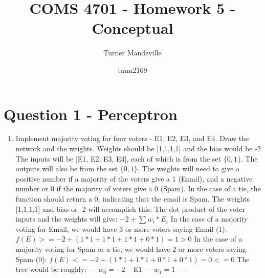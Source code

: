 \documentclass{article}
\title{COMS 4701 - Homework 5 - Conceptual}
\author
{
Turner Mandeville
\and tmm2169
}
\date{}
\begin{document}
    \maketitle
    \section*{Question 1 - Perceptron}
    \begin{enumerate}
        \item Implement majority voting for four voters - E1, E2, E3, and E4. Draw the network and the weights. 
        \newline
        Weights should be [1,1,1,1] and the bias would be -2
        \newline
        The inputs will be [E1, E2, E3, E4], each of which is from the set $\{0, 1\}$. The outputs will also be from the set $\{0, 1\}$.
        \newline
        The weights will need to give a positive number if a majority of the voters give a 1 (Email), and a negative number or 0 if the majority of voters give a 0 (Spam). In the case of a tie, the function should return a 0, indicating that the email is Spam.
        \newline
        The weights [1,1,1,1] and bias or -2 will accomplish this:
        \newline
        \newline
        The dot product of the voter inputs and the weights will give:
        $-2 + \sum w_i * E_i$
        \newline
        \newline
        In the case of a majority voting for Email, we would have 3 or more voters saying Email (1):
        \newline
        $f(E) >= -2 + ( 1*1 + 1*1 + 1*1 + 0*1 ) = 1 > 0$
        \newline
        \newline
        In the case of a majority voting for Spam or a tie, we would have 2 or more voters saying Spam (0):
        \newline
        $f(E) <= -2 + ( 1*1 + 1*1 + 0*1 + 0*1 ) = 0 <= 0$
        \newline
        \newline
        The tree would be roughly:
         --- $w_0 = -2$ --
        \newline
        E1 --- $w_1 = 1$ ----
        \newline

\end{enumerate}
\end{document}
